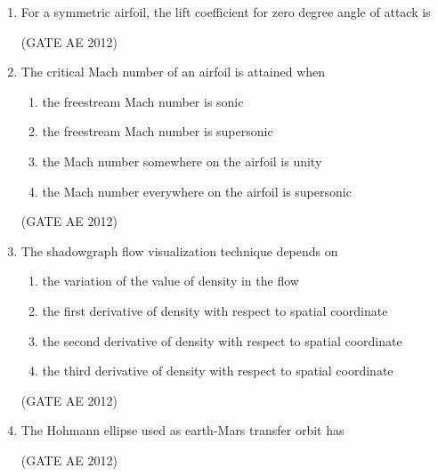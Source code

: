 \documentclass[journal,12pt,onecolumn]{IEEEtran}
\theoremstyle{remark}
\begin{document}
\begin{enumerate}
\item For a symmetric airfoil, the lift coefficient for zero degree angle of attack is
\begin{enumerate}
\end{enumerate}
\hfill(GATE AE 2012) 



\item The critical Mach number of an airfoil is attained when
\begin{enumerate}
\item the freestream Mach number is sonic
\item the freestream Mach number is supersonic
\item the Mach number somewhere on the airfoil is unity
\item the Mach number everywhere on the airfoil is supersonic
\end{enumerate}
\hfill(GATE AE 2012) 



\item The shadowgraph flow visualization technique depends on
\begin{enumerate}
\item the variation of the value of density in the flow
\item the first derivative of density with respect to spatial coordinate
\item the second derivative of density with respect to spatial coordinate
\item the third derivative of density with respect to spatial coordinate
\end{enumerate}
\hfill(GATE AE 2012)



\item The Hohmann ellipse used as earth-Mars transfer orbit has
\begin{enumerate}
\end{enumerate}
\hfill(GATE AE 2012)




\end{enumerate}
\end{document}
